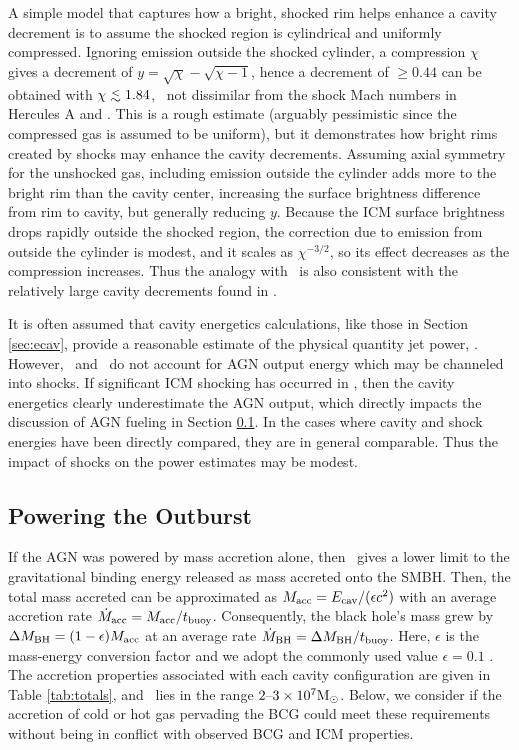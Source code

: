 \documentclass[iop]{emulateapj}
\begin{document}
A simple model that captures how a bright, shocked rim helps enhance a
cavity decrement is to assume the shocked region is cylindrical and
uniformly compressed. Ignoring emission outside the shocked cylinder,
a compression $\chi$ gives a decrement of $y = \sqrt{\chi} -
\sqrt{\chi - 1}$, hence a decrement of $\ge 0.44$ can be obtained with
$\chi \la 1.84$, \ie\ not dissimilar from the shock Mach numbers in
Hercules A and \ms. This is a rough estimate (arguably pessimistic
since the compressed gas is assumed to be uniform), but it
demonstrates how bright rims created by shocks may enhance the cavity
decrements. Assuming axial symmetry for the unshocked gas, including
emission outside the cylinder adds more to the bright rim than the
cavity center, increasing the surface brightness difference from rim
to cavity, but generally reducing $y$. Because the ICM surface
brightness drops rapidly outside the shocked region, the correction
due to emission from outside the cylinder is modest, and it scales as
$\chi^{-3/2}$, so its effect decreases as the compression
increases. Thus the analogy with \ms\ is also consistent with the
relatively large cavity decrements found in \rbs.

It is often assumed that cavity energetics calculations, like those in
Section \ref{sec:ecav}, provide a reasonable estimate of the physical
quantity jet power, \pjet. However, \pcav\ and \pjet\ do not account
for AGN output energy which may be channeled into shocks. If
significant ICM shocking has occurred in \rbs, then the cavity
energetics clearly underestimate the AGN output, which directly
impacts the discussion of AGN fueling in Section
\ref{sec:accretion}. In the cases where cavity and shock energies have
been directly compared, they are in general comparable. Thus the
impact of shocks on the power estimates may be modest.

\subsection{Powering the Outburst}
\label{sec:accretion}

If the AGN was powered by mass accretion alone, then \ecav\ gives a
lower limit to the gravitational binding energy released as mass
accreted onto the SMBH. Then, the total mass accreted can be
approximated as $M_{\rm{acc}} = E_{\rm{cav}}/(\epsilon c^2)$ with an average
accretion rate $\dot{M}_{\rm{acc}} = M_{\rm{acc}}/t_{\rm{buoy}}$. Consequently, the black hole's
mass grew by $\Delta M_{\rm{BH}} = (1-\epsilon)M_{\rm{acc}}$ at an average rate $\dot{M}_{\rm{BH}} =
\Delta M_{\rm{BH}}/t_{\rm{buoy}}$. Here, $\epsilon$ is the mass-energy conversion factor
and we adopt the commonly used value $\epsilon = 0.1$
\citep{2002apa..book.....F}. The accretion properties associated with
each cavity configuration are given in Table \ref{tab:totals}, and
\macc\ lies in the range $2 \mbox{--} 3 \times 10^7 \rm{M_{\odot}}$. Below, we
consider if the accretion of cold or hot gas pervading the BCG could
meet these requirements without being in conflict with observed BCG
and ICM properties.
\end{document}
